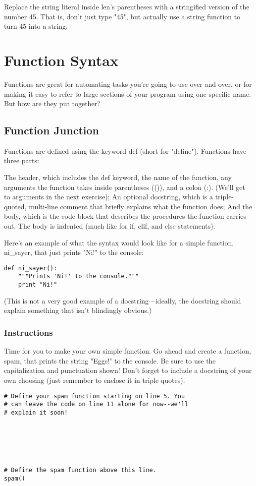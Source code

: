\documentclass[12pt,a4paper,final,twoside,onecolumn,titlepage]{book}
\begin{document}
Replace the string literal inside len's parentheses with a stringified version of the number 45. That is, don't just type "45", but actually use a string function to turn 45 into a string.

\section{Function Syntax}
Functions are great for automating tasks you're going to use over and over, or for making it easy to refer to large sections of your program using one specific name. But how are they put together?

\subsection{Function Junction}

Functions are defined using the keyword def (short for "define"). Functions have three parts:

    The header, which includes the def keyword, the name of the function, any arguments the function takes inside parentheses (()), and a colon (:). (We'll get to arguments in the next exercise);
    An optional docstring, which is a triple-quoted, multi-line comment that briefly explains what the function does;
    And the body, which is the code block that describes the procedures the function carries out. The body is indented (much like for if, elif, and else statements).

Here's an example of what the syntax would look like for a simple function, ni\_sayer, that just prints "Ni!" to the console:
\begin{lstlisting}
def ni_sayer():
    """Prints 'Ni!' to the console."""
    print "Ni!"
\end{lstlisting}

(This is not a very good example of a docstring—ideally, the docstring should explain something that isn't blindingly obvious.)
\subsubsection{Instructions}

Time for you to make your own simple function. Go ahead and create a function, spam, that prints the string "Eggs!" to the console. Be sure to use the capitalization and punctuation shown! Don't forget to include a docstring of your own choosing (just remember to enclose it in triple quotes).

\begin{lstlisting}
# Define your spam function starting on line 5. You
# can leave the code on line 11 alone for now--we'll
# explain it soon!






# Define the spam function above this line.
spam()
\end{lstlisting}
\end{document}
